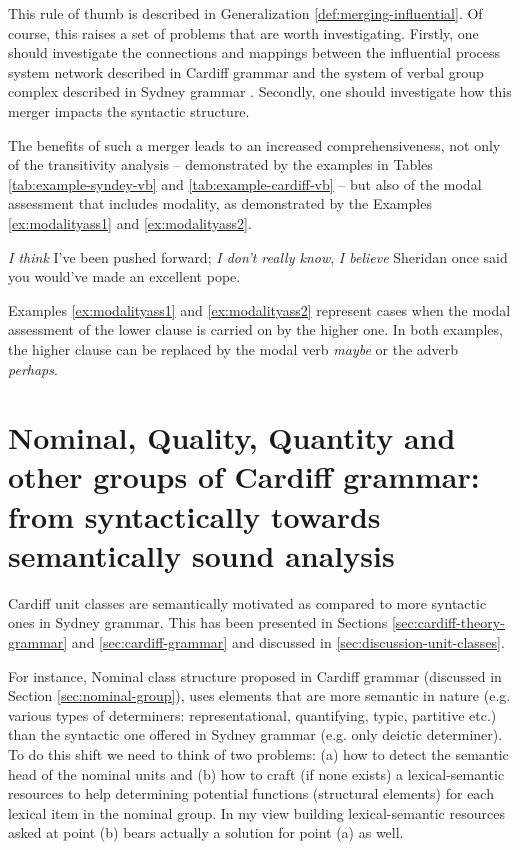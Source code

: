 This rule of thumb is described in Generalization \ref{def:merging-influential}. Of course, this raises a set of problems that are worth investigating. Firstly, one should investigate the connections and mappings between the influential process system network described in Cardiff grammar and the system of verbal group complex described in Sydney grammar \citep[p.589]{Halliday2013}. Secondly, one should investigate how this merger impacts the syntactic structure. 

The benefits of such a merger leads to an increased comprehensiveness, not only of the transitivity analysis -- demonstrated by the examples in Tables \ref{tab:example-syndey-vb} and \ref{tab:example-cardiff-vb} -- but also of the modal assessment that includes modality, as demonstrated by the Examples \ref{ex:modalityass1} and \ref{ex:modalityass2}. 

\begin{exe}
	\ex\label{ex:modalityass1} \textit{I think} I've been pushed forward; \textit{I don't really know}, \citep[p.183]{Halliday2013}
	\ex\label{ex:modalityass2} \textit{I believe} Sheridan once said you would've made an excellent pope. \citep[p.182]{Halliday2013}
\end{exe}

Examples \ref{ex:modalityass1} and \ref{ex:modalityass2} represent cases when the modal assessment of the lower clause is carried on by the higher one. In both examples, the higher clause can be replaced by the modal verb \textit{maybe} or the adverb \textit{perhaps}. 

\section{Nominal, Quality, Quantity and other groups of Cardiff grammar: from syntactically towards semantically sound analysis}
Cardiff unit classes are semantically motivated as compared to more syntactic ones in Sydney grammar. This has been presented in Sections \ref{sec:cardiff-theory-grammar} and \ref{sec:cardiff-grammar} and discussed in \ref{sec:discussion-unit-classes}.

For instance, Nominal class structure proposed in Cardiff grammar (discussed in Section \ref{sec:nominal-group}), uses elements that are more semantic in nature (e.g. various types of determiners: representational, quantifying, typic, partitive etc.) than the syntactic one offered in Sydney grammar (e.g. only deictic determiner). To do this shift we need to think of two problems: (a) how to detect the semantic head of the nominal units and (b) how to craft (if none exists) a lexical-semantic resources to help determining potential functions (structural elements) for each lexical item in the nominal group. In my view building lexical-semantic resources asked at point (b) bears actually a solution for point (a) as well.

